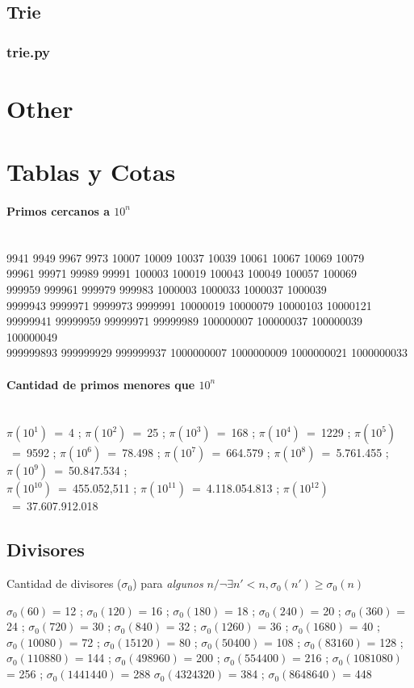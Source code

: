 \documentclass{article}
\newcommand\codefile[2]{    
    \subsubsection{#2}
    
    
}
\begin{document}
\begin{multicols*}{2}
\subsection{Trie}
\codefile{strings/trie.py}{trie.py}

\section{Other}

\section{Tablas y Cotas}
\paragraph{Primos cercanos a $10^n$}\ \\
9941 9949 9967 9973 10007 10009 10037 10039 10061 10067 10069 10079\\
99961 99971 99989 99991 100003 100019 100043 100049 100057 100069\\
999959 999961 999979 999983 1000003 1000033 1000037 1000039\\
9999943 9999971 9999973 9999991 10000019 10000079 10000103 10000121\\
99999941 99999959 99999971 99999989 100000007 100000037 100000039 100000049\\
999999893 999999929 999999937 1000000007 1000000009 1000000021 1000000033

\paragraph{Cantidad de primos menores que $10^n$}\ \\
$\pi(10^1)$~=~4 ;
$\pi(10^2)$~=~25 ;
$\pi(10^3)$~=~168 ;
$\pi(10^4)$~=~1229 ;
$\pi(10^5)$~=~9592 ;
$\pi(10^6)$~=~78.498 ;
$\pi(10^7)$~=~664.579 ;
$\pi(10^8)$~=~5.761.455 ;
$\pi(10^9)$~=~50.847.534 ;\\
$\pi(10^{10})$~=~455.052,511 ;
$\pi(10^{11})$~=~4.118.054.813 ;
$\pi(10^{12})$~=~37.607.912.018
%
%
%
\subsection{Divisores}
Cantidad de divisores ($\sigma_0$) para \emph{algunos} $n / \neg\exists n'<n, \sigma_0(n') \geqslant \sigma_0(n)$

$\sigma_0(60)$ = 12 ; $\sigma_0(120)$ = 16 ; $\sigma_0(180)$ = 18 ; $\sigma_0(240)$ = 20 ; $\sigma_0(360)$ = 24 ;
$\sigma_0(720)$ = 30 ; $\sigma_0(840)$ = 32 ; $\sigma_0(1260)$ = 36 ; $\sigma_0(1680)$ = 40 ; $\sigma_0(10080)$ = 72 ; $\sigma_0(15120)$ = 80 ; $\sigma_0(50400)$ = 108 ; $\sigma_0(83160)$ = 128 ; $\sigma_0(110880)$ = 144 ;
$\sigma_0(498960)$ = 200 ; $\sigma_0(554400)$ = 216 ; $\sigma_0(1081080)$ = 256 ; $\sigma_0(1441440)$ = 288  $\sigma_0(4324320)$ = 384 ; $\sigma_0(8648640)$ = 448


\end{multicols*}
\end{document}
